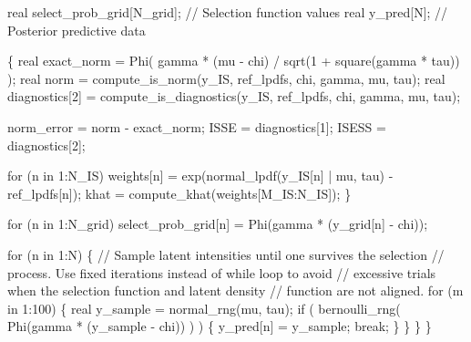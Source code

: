 \documentclass[
  letterpaper,
  DIV=11,
  numbers=noendperiod]{scrartcl}
\newenvironment{Shaded}{\begin{snugshade}}{\end{snugshade}}
\newcommand{\CommentTok}[1]{\textcolor[rgb]{0.37,0.37,0.37}{#1}}
\newcommand{\ControlFlowTok}[1]{\textcolor[rgb]{0.00,0.23,0.31}{#1}}
\newcommand{\DataTypeTok}[1]{\textcolor[rgb]{0.68,0.00,0.00}{#1}}
\newcommand{\DecValTok}[1]{\textcolor[rgb]{0.68,0.00,0.00}{#1}}
\newcommand{\NormalTok}[1]{\textcolor[rgb]{0.00,0.23,0.31}{#1}}
\begin{document}
\begin{codelisting}
\begin{Shaded}
\begin{Highlighting}[]
  \DataTypeTok{real}\NormalTok{ select\_prob\_grid[N\_grid]; }\CommentTok{// Selection function values}
  \DataTypeTok{real}\NormalTok{ y\_pred[N];                }\CommentTok{// Posterior predictive data}
  
\NormalTok{\{}
    \DataTypeTok{real}\NormalTok{ exact\_norm = Phi(  gamma * (mu {-} chi)}
\NormalTok{                          / sqrt(}\DecValTok{1}\NormalTok{ + square(gamma * tau)) );}
    \DataTypeTok{real}\NormalTok{ norm = compute\_is\_norm(y\_IS, ref\_lpdfs,}
\NormalTok{                                chi, gamma, mu, tau);}
    \DataTypeTok{real}\NormalTok{ diagnostics[}\DecValTok{2}\NormalTok{] = compute\_is\_diagnostics(y\_IS, ref\_lpdfs,}
\NormalTok{                                                 chi, gamma, mu, tau);}

\NormalTok{    norm\_error = norm {-} exact\_norm;}
\NormalTok{    ISSE = diagnostics[}\DecValTok{1}\NormalTok{];}
\NormalTok{    ISESS = diagnostics[}\DecValTok{2}\NormalTok{];}

    \ControlFlowTok{for}\NormalTok{ (n }\ControlFlowTok{in} \DecValTok{1}\NormalTok{:N\_IS)}
\NormalTok{      weights[n] = exp(normal\_lpdf(y\_IS[n] | mu, tau) {-} ref\_lpdfs[n]);}
\NormalTok{    khat = compute\_khat(weights[M\_IS:N\_IS]);}
\NormalTok{  \}}
  
  \ControlFlowTok{for}\NormalTok{ (n }\ControlFlowTok{in} \DecValTok{1}\NormalTok{:N\_grid)}
\NormalTok{    select\_prob\_grid[n] = Phi(gamma * (y\_grid[n] {-} chi));}

  \ControlFlowTok{for}\NormalTok{ (n }\ControlFlowTok{in} \DecValTok{1}\NormalTok{:N) \{}
    \CommentTok{// Sample latent intensities until one survives the selection}
    \CommentTok{// process.  Use fixed iterations instead of while loop to avoid }
    \CommentTok{// excessive trials when the selection function and latent density }
    \CommentTok{// function are not aligned.}
    \ControlFlowTok{for}\NormalTok{ (m }\ControlFlowTok{in} \DecValTok{1}\NormalTok{:}\DecValTok{100}\NormalTok{) \{}
      \DataTypeTok{real}\NormalTok{ y\_sample = normal\_rng(mu, tau);}
      \ControlFlowTok{if}\NormalTok{ ( bernoulli\_rng( Phi(gamma * (y\_sample {-} chi)) ) ) \{}
\NormalTok{        y\_pred[n] = y\_sample;}
        \ControlFlowTok{break}\NormalTok{;}
\NormalTok{      \}}
\NormalTok{    \}}
\NormalTok{  \}}
\NormalTok{\}}
\end{Highlighting}
\end{Shaded}

\end{codelisting}
\end{document}
